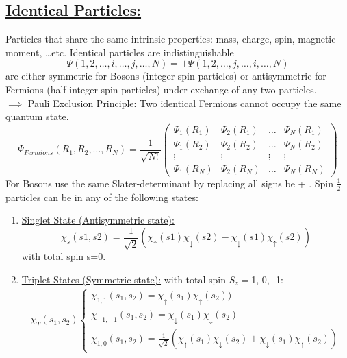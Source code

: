 \documentclass[a4paper,12pt]{article}
\begin{document}
\subsection*{\underline{Identical Particles:}}
Particles that share the same intrinsic properties: mass, charge, spin, magnetic moment, \dots etc. Identical particles are indistinguishable
\begin{equation}
\Psi(1, 2, \dots, i, \dots, j, \dots, N)=\pm\Psi(1, 2, \dots, j, \dots, i, \dots, N)
\end{equation}
are either symmetric for Bosons (integer spin particles) or antisymmetric for Fermions (half integer spin particles) under exchange of any two particles.\\
$\implies$ Pauli Exclusion Principle: Two identical Fermions cannot occupy the same quantum state.
\begin{equation}
\Psi_{Fermions}(R_1,R_2,\dots,R_N)= \frac{1}{\sqrt{N!}}
\left(\begin{matrix}
\Psi_1(R_1)	&\Psi_2(R_1)		&\dots 	&\Psi_N(R_1)\\
\Psi_1(R_2)	&\Psi_2(R_2)		&\dots 	&\Psi_N(R_2)\\
\vdots 	&\vdots 		&\vdots 	&\vdots\\
\Psi_1(R_N)	&\Psi_2(R_N)		&\dots 	&\Psi_N(R_N)
\end{matrix}\right)
\end{equation}
For Bosons use the same Slater-determinant by replacing all signs be + .
Spin $\frac{1}{2}$ particles can be in any of the following states:
\begin{enumerate}
\item[] \underline{Singlet State (Antisymmetric state):} \begin{equation} \chi_s(s1,s2)=\frac{1}{\sqrt{2}}(\chi_{\uparrow}(s1)\chi_{\downarrow}(s2)-\chi_{\downarrow}(s1)\chi_{\uparrow}(s2)) \end{equation} with total spin s=0.
\item[] \underline{Triplet States (Symmetric state):} with total spin $S_z=$1, 0, -1:
\begin{gather}
\chi_T(s_1, s_2) 
\begin{cases}
\chi_{1,1}(s_1,s_2)=\chi_{\uparrow}(s_1)\chi_{\uparrow}(s_2)) \\
\chi_{-1,-1}(s_1,s_2)=\chi_{\downarrow}(s_1)\chi_{\downarrow}(s_2) \\
\chi_{1,0}(s_1,s_2)=\frac{1}{\sqrt{2}}(\chi_{\uparrow}(s_1)\chi_{\downarrow}(s_2)+\chi_{\downarrow}(s_1)\chi_{\uparrow}(s_2))
\end{cases}
\end{gather}
\end{enumerate}
\end{document}
